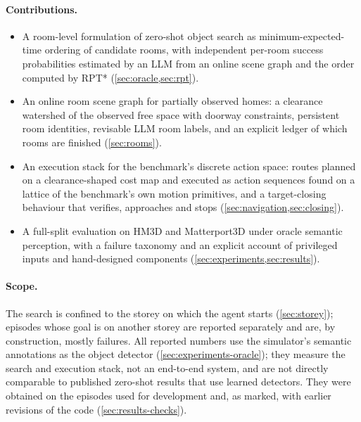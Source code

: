 \documentclass[10pt]{article}
\begin{document}
\paragraph{Contributions.}
\begin{itemize}[leftmargin=*,itemsep=2pt,topsep=2pt]
  \item A room-level formulation of zero-shot object search as
        minimum-expected-time ordering of candidate rooms, with independent
        per-room success probabilities estimated by an LLM from an online scene
        graph and the order computed by RPT* (\cref{sec:oracle,sec:rpt}).
  \item An online room scene graph for partially observed homes: a clearance
        watershed of the observed free space with doorway constraints,
        persistent room identities, revisable LLM room labels, and an explicit
        ledger of which rooms are finished (\cref{sec:rooms}).
  \item An execution stack for the benchmark's discrete action space: routes
        planned on a clearance-shaped cost map and executed as action
        sequences found on a lattice of the benchmark's own motion primitives,
        and a target-closing behaviour that verifies, approaches and stops
        (\cref{sec:navigation,sec:closing}).
  \item A full-split evaluation on HM3D and Matterport3D under oracle semantic
        perception, with a failure taxonomy and an explicit account of
        privileged inputs and hand-designed components
        (\cref{sec:experiments,sec:results}).
\end{itemize}

\paragraph{Scope.} The search is confined to the storey on which the agent
starts (\cref{sec:storey}); episodes whose goal is on another storey are
reported separately and are, by construction, mostly failures. All reported
numbers use the simulator's semantic annotations as the object detector
(\cref{sec:experiments-oracle}); they measure the search and execution
stack, not an end-to-end system, and are not directly comparable to published
zero-shot results that use learned detectors. They were obtained on the
episodes used for development and, as marked, with earlier revisions of the
code (\cref{sec:results-checks}).

\end{document}

